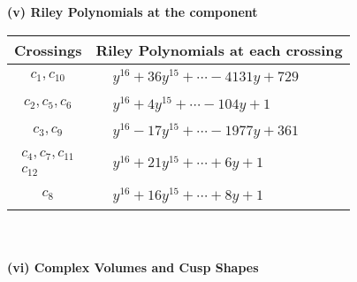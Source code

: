 \documentclass[1p]{elsarticle_modified}
\theoremstyle{definition}
\begin{document}
\newpage\renewcommand{\arraystretch}{1}
\flushleft \textbf{(v) Riley Polynomials at the component}\newline \\
\begin{tabular}{m{50pt}|m{274pt}}
Crossings & \hspace{64pt}Riley Polynomials at each crossing \\
\hline $$\begin{aligned}c_{1},c_{10}\end{aligned}$$&$\begin{aligned}
&y^{16}+36 y^{15}+\cdots-4131 y+729
\end{aligned}$\\
\hline $$\begin{aligned}c_{2},c_{5},c_{6}\end{aligned}$$&$\begin{aligned}
&y^{16}+4 y^{15}+\cdots-104 y+1
\end{aligned}$\\
\hline $$\begin{aligned}c_{3},c_{9}\end{aligned}$$&$\begin{aligned}
&y^{16}-17 y^{15}+\cdots-1977 y+361
\end{aligned}$\\
\hline $$\begin{aligned}c_{4},c_{7},c_{11}\\c_{12}\end{aligned}$$&$\begin{aligned}
&y^{16}+21 y^{15}+\cdots+6 y+1
\end{aligned}$\\
\hline $$\begin{aligned}c_{8}\end{aligned}$$&$\begin{aligned}
&y^{16}+16 y^{15}+\cdots+8 y+1
\end{aligned}$\\
\hline
\end{tabular}\\~\\
\newpage\flushleft \textbf{(vi) Complex Volumes and Cusp Shapes}
\end{document}
